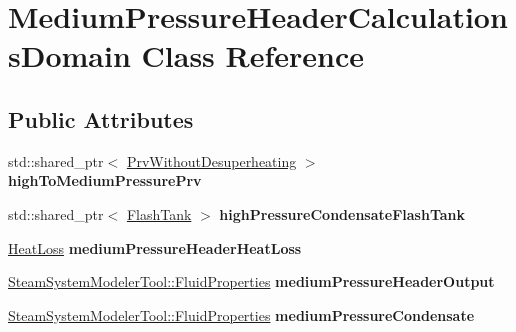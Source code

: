 \hypertarget{class_medium_pressure_header_calculations_domain}{}\section{Medium\+Pressure\+Header\+Calculations\+Domain Class Reference}
\label{class_medium_pressure_header_calculations_domain}
\subsection*{Public Attributes}
\begin{DoxyCompactItemize}
\item 
\mbox{\label{class_medium_pressure_header_calculations_domain_a650902ee454ce4f49c777756e1f20a93}} 
std\+::shared\+\_\+ptr$<$ \hyperlink{class_prv_without_desuperheating}{Prv\+Without\+Desuperheating} $>$ {\bfseries high\+To\+Medium\+Pressure\+Prv}
\item 
\mbox{\label{class_medium_pressure_header_calculations_domain_a91a4046d8cbbca9f5050f959d89d777b}} 
std\+::shared\+\_\+ptr$<$ \hyperlink{class_flash_tank}{Flash\+Tank} $>$ {\bfseries high\+Pressure\+Condensate\+Flash\+Tank}
\item 
\mbox{\label{class_medium_pressure_header_calculations_domain_a4fcb76d78e0ea3b4123997193c3c416c}} 
\hyperlink{class_heat_loss}{Heat\+Loss} {\bfseries medium\+Pressure\+Header\+Heat\+Loss}
\item 
\mbox{\label{class_medium_pressure_header_calculations_domain_afb29e2142d873335f7b3ca5ad382e56b}} 
\hyperlink{struct_steam_system_modeler_tool_1_1_fluid_properties}{Steam\+System\+Modeler\+Tool\+::\+Fluid\+Properties} {\bfseries medium\+Pressure\+Header\+Output}
\item 
\mbox{\label{class_medium_pressure_header_calculations_domain_a09d571678cfa01748ace744ce08fa85b}} 
\hyperlink{struct_steam_system_modeler_tool_1_1_fluid_properties}{Steam\+System\+Modeler\+Tool\+::\+Fluid\+Properties} {\bfseries medium\+Pressure\+Condensate}

\end{DoxyCompactItemize}
